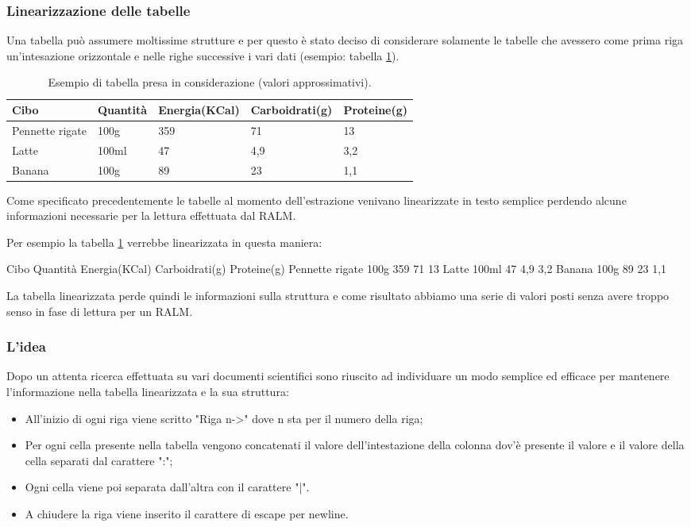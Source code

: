 \subsubsection{Linearizzazione delle tabelle}
\label{subsubsec-lin-tab}
Una tabella può assumere moltissime strutture e per questo è stato deciso di considerare solamente le tabelle che avessero come prima riga 
un'intesazione orizzontale e nelle righe successive i vari dati (esempio: tabella \ref{tab:esempio-cibo}).

\begin{table}[H]
    \centering
    \begin{tabular}{|p{3cm} |p{2cm} |p{2cm}| p{2cm}| p{2cm}|}
        \hline
        Cibo & Quantità & Energia(KCal) & Carboidrati(g) & Proteine(g) \\
        \hline
        Pennette rigate & 100g & 359 & 71 & 13 \\
        \hline
        Latte & 100ml & 47 & 4,9 & 3,2 \\
        \hline
        Banana & 100g & 89 & 23 & 1,1 \\
        \hline
    \end{tabular}
    \caption{Esempio di tabella presa in considerazione (valori approssimativi).}
    \label{tab:esempio-cibo}
\end{table}
\noindent Come specificato precedentemente le tabelle al momento dell'estrazione venivano linearizzate in testo semplice
perdendo alcune informazioni necessarie per la lettura effettuata dal RALM. 

\noindent Per esempio la tabella \ref{tab:esempio-cibo} verrebbe linearizzata in questa maniera:
\begin{tcolorbox}[colback=white, colframe=black]
    Cibo Quantità Energia(KCal) Carboidrati(g) Proteine(g) Pennette rigate  100g  359  71  13 Latte 100ml 47 4,9 3,2 Banana  100g 89 23 1,1
\end{tcolorbox}
\noindent La tabella linearizzata perde quindi le informazioni sulla struttura e come risultato abbiamo una serie di valori posti senza avere troppo senso in fase di lettura per un RALM. \\

\subsubsection{L'idea}
\noindent Dopo un attenta ricerca effettuata su vari documenti scientifici sono riuscito ad individuare un modo semplice ed efficace per mantenere 
l'informazione nella tabella linearizzata e la sua struttura:
\begin{itemize}
    \item All'inizio di ogni riga viene scritto "Riga n->" dove n sta per il numero della riga;
    \item Per ogni cella presente nella tabella vengono concatenati il valore dell'intestazione della colonna dov'è presente il valore e il valore della cella separati dal carattere ":";
    \item Ogni cella viene poi separata dall'altra con il carattere "|".
    \item A chiudere la riga viene inserito il carattere di escape per newline.
\end{itemize} 

